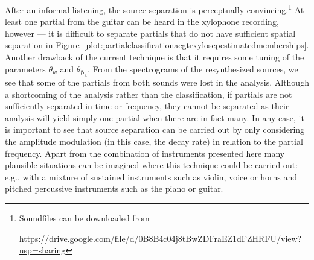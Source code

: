 After an informal listening, the source separation is perceptually
convincing.\footnote{Soundfiles can be downloaded from \par
\url{https://drive.google.com/file/d/0B8B4c04j8tBwZDFraEZ1dFZHRFU/view?usp=sharing}}
At least one partial from the guitar can be heard in the xylophone recording,
however --- it is difficult to separate partials that do not have sufficient
spatial separation in
Figure~\ref{plot:partialclassificationacgtrxylosepestimatedmemberships}. Another
drawback of the current technique is that it requires some tuning of the
parameters $\theta_{w}$ and $\theta_{\boldsymbol{\beta}_{\boldsymbol{a}}}$.
From the spectrograms of the resynthesized sources, we see that some of the
partials from both sounds were lost in the analysis.  Although a shortcoming of
the analysis rather than the classification, if partials are not sufficiently
separated in time or frequency, they cannot be separated as their analysis will
yield simply one partial when there are in fact many. In any case, it is important
to see that source separation can be carried out by only considering the
amplitude modulation (in this case, the decay rate) in relation to the partial
frequency. Apart from the combination of instruments presented here many
plausible situations can be imagined where this technique could be carried out:
e.g., with a mixture of sustained instruments such as violin, voice or horns and
pitched percussive instruments such as the piano or guitar.
